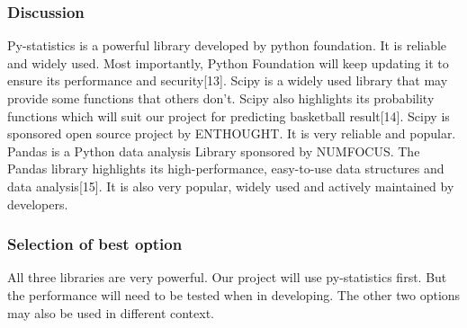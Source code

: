 \documentclass[journal,onecolumn]{IEEEtran}
\begin{document}
\subsubsection{Discussion}
Py-statistics is a powerful library developed by python foundation. It is reliable and widely used. Most importantly, Python Foundation will keep updating it to ensure its performance and security[13]. Scipy is a widely used library that may provide some functions that others don't. Scipy also highlights its probability functions which will suit our project for predicting basketball result[14]. Scipy is sponsored open source project by ENTHOUGHT. It is very reliable and popular. Pandas is a Python data analysis Library sponsored by NUMFOCUS. The Pandas library highlights its high-performance, easy-to-use data structures and data analysis[15]. It is also very popular, widely used and actively maintained by developers. 
\subsubsection{Selection of best option}
All three libraries are very powerful. Our project will use py-statistics first. But the performance will need to be tested when in developing. The other two options may also be used in different context.
%
%

\end{document}
